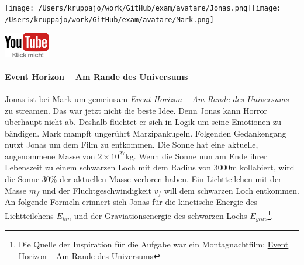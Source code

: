 \documentclass[a4paper, 9pt]{scrartcl}\usepackage[]{graphicx}\usepackage[]{xcolor}
\begin{document}
 
\ifcollection
\begin{flushright}
\tiny\vspace{-3Ex}
\textbf{\examinhaltstart}
\exammodulemathstat
\vspace{-4Ex}
\end{flushright}
\begin{minipage}[t]{0.5\textwidth}
\texttt{[image: /Users/kruppajo/work/GitHub/exam/avatare/Jonas.png]}\hspace{-4mm}\texttt{[image: /Users/kruppajo/work/GitHub/exam/avatare/Mark.png]}
\end{minipage}
\begin{minipage}[t]{0.5\textwidth}
\hfill
\href{https://youtu.be/q-qYK4Chslg}{\includegraphics[width = 2cm]{img/youtube}}
\end{minipage}
\fi



\ifcollection
\paragraph{Event Horizon -- Am Rande des Universums}
\fi



Jonas ist bei Mark um gemeinsam \textit{Event Horizon -- Am Rande des Universums} zu streamen. Das war jetzt nicht die beste Idee. Denn Jonas kann Horror überhaupt nicht ab. Deshalb flüchtet er sich in Logik um seine Emotionen zu bändigen. Mark mampft ungerührt Marzipankugeln. Folgenden Gedankengang nutzt Jonas um dem Film zu entkommen. Die Sonne hat eine aktuelle, angenommene Masse von $\ensuremath{2\times 10^{27}}$kg. Wenn die Sonne nun am Ende ihrer Lebenszeit zu einem schwarzen Loch mit dem Radius von $3000$m kollabiert, wird die Sonne $30$\% der aktuellen Masse verloren haben. Ein Lichtteilchen mit der Masse $m_f$ und der Fluchtgeschwindigkeit $v_f$ will dem schwarzen Loch entkommen. An folgende Formeln erinnert sich Jonas für die kinetische Energie des Lichtteilchens $E_{kin}$ und der Graviationsenergie des schwarzen Lochs $E_{grav}$\footnote{Die Quelle der Inspiration für die Aufgabe war ein Montagnachtfilm: \href{https://de.wikipedia.org/wiki/Event_Horizon_–_Am_Rande_des_Universums}{Event Horizon – Am Rande des Universums}}.
\end{document}
